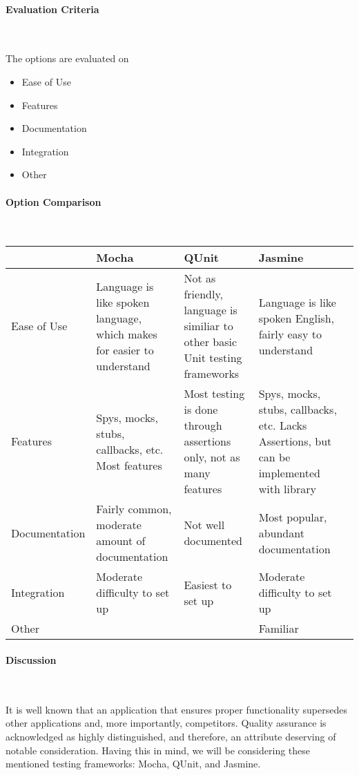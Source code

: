 \documentclass[letterpaper, 10pt, draftclsnofoot, compsoc, onecolumn]{IEEEtran}
\begin{document}
{\medskip
\newpage
\paragraph{Evaluation Criteria} ~\\
{\noindent The options are evaluated on

\begin{itemize}
\item Ease of Use
\item Features
\item Documentation
\item Integration
\item Other
\end{itemize}

 \par}


\newpage
\paragraph{Option Comparison} ~\\
\tablehead{}
\begin{supertabular}{|p{2cm}|p{2.5cm}|p{2.5cm}|p{2.5cm}|p{2.5cm}|}
\hline 
& Mocha 
& QUnit 
& Jasmine\\ \hline
Ease of Use 
	& Language is like spoken language, which makes for easier to understand 
	& Not as friendly, language is similiar to other basic Unit testing frameworks 	& Language is like spoken English, fairly easy to understand\\ \hline
Features & Spys, mocks, stubs, callbacks, etc. Most features & Most testing is done through assertions only, not as many features & Spys, mocks, stubs, callbacks, etc. Lacks Assertions, but can be implemented with library\\ \hline
Documentation & Fairly common, moderate amount of documentation & Not well documented & Most popular, abundant documentation \\ \hline
Integration & Moderate difficulty to set up & Easiest to set up & Moderate difficulty to set up\\ \hline
Other & & & Familiar\\ \hline
\end{supertabular}

\newpage
\paragraph{Discussion} ~\\
{\noindent It is well known that an application that ensures proper functionality supersedes other applications and, 
more importantly, competitors. Quality assurance is acknowledged as highly distinguished, and therefore, 
an attribute deserving of notable consideration. Having this in mind, we will be considering these mentioned 
testing frameworks: Mocha, QUnit, and Jasmine. \par}

}
\end{document}
